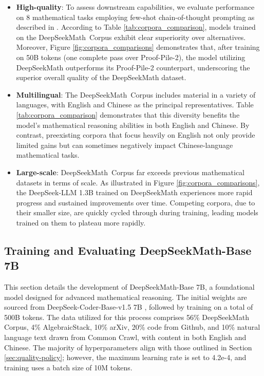 \begin{itemize}[topsep=0pt]
    \item \textbf{High-quality}:
    To assess downstream capabilities, we evaluate performance on 8 mathematical tasks employing few-shot chain-of-thought prompting as described in \cite{cot}. According to Table \ref{tab:corpora_comparison}, models trained on the DeepSeekMath~Corpus exhibit clear superiority over alternatives. Moreover, Figure \ref{fig:corpora_comparisons} demonstrates that, after training on 50B tokens (one complete pass over Proof-Pile-2), the model utilizing DeepSeekMath outperforms its Proof-Pile-2 counterpart, underscoring the superior overall quality of the DeepSeekMath dataset.
    \item \textbf{Multilingual}:
    The DeepSeekMath~Corpus includes material in a variety of languages, with English and Chinese as the principal representatives. Table \ref{tab:corpora_comparison} demonstrates that this diversity benefits the model’s mathematical reasoning abilities in both English and Chinese. By contrast, preexisting corpora that focus heavily on English not only provide limited gains but can sometimes negatively impact Chinese-language mathematical tasks.
    \item \textbf{Large-scale}:
    DeepSeekMath~Corpus far exceeds previous mathematical datasets in terms of scale. As illustrated in Figure \ref{fig:corpora_comparisons}, the DeepSeek-LLM 1.3B trained on DeepSeekMath experiences more rapid progress and sustained improvements over time. Competing corpora, due to their smaller size, are quickly cycled through during training, leading models trained on them to plateau more rapidly.
\end{itemize}

\subsection{Training and Evaluating DeepSeekMath-Base 7B}

This section details the development of DeepSeekMath-Base 7B, a foundational model designed for advanced mathematical reasoning. The initial weights are sourced from DeepSeek-Coder-Base-v1.5 7B \citep{deepseek-coder}, followed by training on a total of 500B tokens. The data utilized for this process comprises 56\% DeepSeekMath Corpus, 4\% AlgebraicStack, 10\% arXiv, 20\% code from Github, and 10\% natural language text drawn from Common Crawl, with content in both English and Chinese. The majority of hyperparameters align with those outlined in Section \ref{sec:quality-policy}; however, the maximum learning rate is set to 4.2e-4, and training uses a batch size of 10M tokens.

